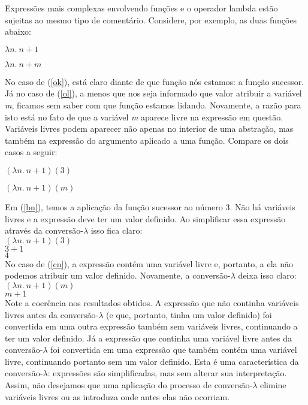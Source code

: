Expressões mais complexas envolvendo funções e o operador
lambda estão sujeitas ao mesmo tipo de comentário. Considere,
por exemplo, as duas funções abaixo:

\begin{exe}
	\ex $\lambda n.\ n+1$ \label{ok}
\end{exe}

\begin{exe}
	\ex $\lambda n.\ n+m$ \label{ol}
\end{exe}

\n No caso de (\ref{ok}), está claro diante de que função nós
estamos: a função sucessor. Já no caso de (\ref{ol}), a menos
que nos seja informado que valor atribuir a variável \textit{m},
ficamos sem saber com que função estamos lidando. Novamente, a
razão para isto está no fato de que a variável \textit{m} aparece
livre na expressão em questão. Variáveis livres podem aparecer não
apenas no interior de uma abstração, mas também na expressão do
argumento aplicado a uma função. Compare os dois casos a seguir:

\begin{exe}
	\ex  $(\lambda n.\ n+1)(3)$ \label{bn}
\end{exe}

\begin{exe}
	\ex  $(\lambda n.\ n+1)(m)$ \label{cn}
\end{exe}

\n Em (\ref{bn}), temos a aplicação da função sucessor ao
número 3. Não há variáveis livres e a expressão deve ter um valor
definido. Ao simplificar essa expressão através da
conversão-$\lambda$ isso
fica claro:\\

\n $(\lambda n.\ n+1)(3)$\\
$3+1$\\
$4$\\

\n No caso de (\ref{cn}), a expressão contém uma variável livre e, portanto, a ela não podemos atribuir um valor definido. Novamente,
a conversão-$\lambda$ deixa isso claro:\\

\n $(\lambda n.\ n+1)(m)$\\
$m+1$\\

\n Note a coerência nos resultados obtidos. A expressão que não
continha variáveis livres antes da conversão-$\lambda$ (e que,
portanto, tinha um valor definido) foi convertida em uma outra
expressão também sem variáveis livres, continuando a ter um valor
definido. Já a expressão que continha uma variável livre antes da
conversão-$\lambda$ foi convertida em uma expressão que também
contém uma variável livre, continuando portanto sem um valor
definido. Esta é uma característica da conversão-$\lambda$:
expressões são simplificadas, mas sem alterar sua interpretação.
Assim, não desejamos que uma aplicação do processo de
conversão-$\lambda$ elimine variáveis livres ou as introduza onde
antes elas não ocorriam.

